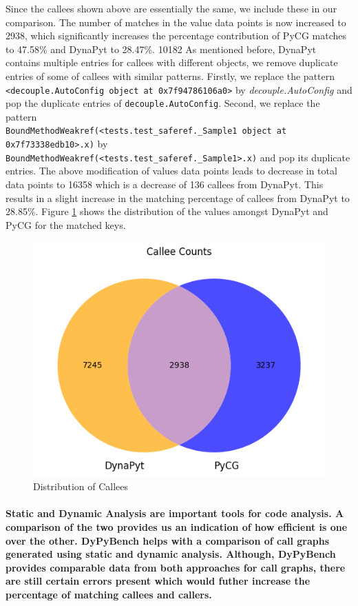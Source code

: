 Since the callees shown above are essentially the same, we include these in our comparison.
The number of matches in the value data points is now increased to 2938, which significantly increases the percentage contribution of PyCG matches to 47.58\% and DynaPyt to 28.47\%. 10182
As mentioned before, DynaPyt contains multiple entries for callees with different objects, we remove duplicate entries of some of callees with similar patterns.
Firstly, we replace the pattern \verb|<decouple.AutoConfig object at 0x7f94786106a0>| by \textit{decouple.AutoConfig} and pop the duplicate entries of \verb|decouple.AutoConfig|.
Second, we replace the pattern \\\verb|BoundMethodWeakref(<tests.test_saferef._Sample1 object at 0x7f73338edb10>.x)| by \\\verb|BoundMethodWeakref(<tests.test_saferef._Sample1>.x)| and pop its duplicate entries.
The above modification of values data points leads to decrease in total data points to 16358 which is a decrease of 136 callees from DynaPyt.
This results in a slight increase in the matching percentage of callees from DynaPyt to 28.85\%.
Figure \ref{fig:callee_counts} shows the distribution of the values amongst DynaPyt and PyCG for the matched keys.
\begin{figure}[ht]
    \centering
    \includegraphics[width=0.3\linewidth]{figures/evaluation/calleecounts.png}
    \caption[Distribution of Callees]{\label{fig:callee_counts}Distribution of Callees}
\end{figure}

\paragraph{Static and Dynamic Analysis are important tools for code analysis. A comparison of the two provides us an indication of how efficient is one over the other. DyPyBench helps with a comparison of call graphs generated using static and dynamic analysis. Although, DyPyBench provides comparable data from both approaches for call graphs, there are still certain errors present which would futher increase the percentage of matching callees and callers.}
